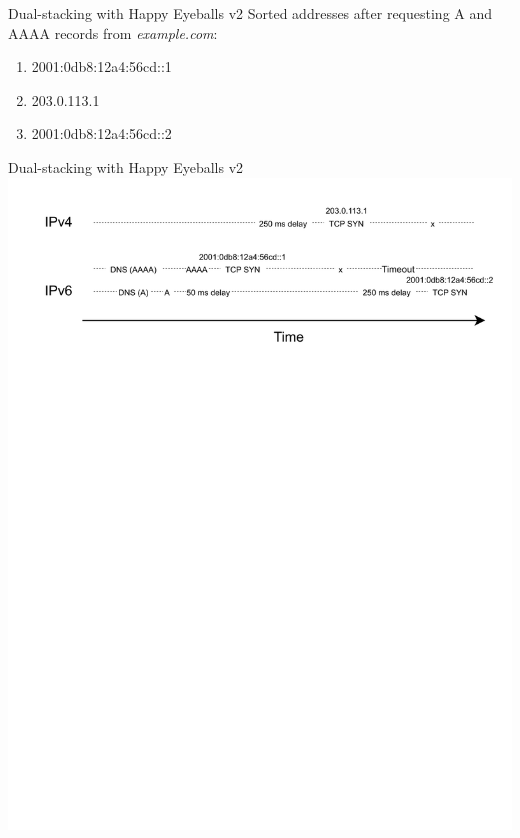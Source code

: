 \documentclass[aspectratio=169]{beamer}
\begin{document}
\begin{frame}{Dual-stacking with Happy Eyeballs v2}
  Sorted addresses after requesting A and AAAA records from \textit{example.com}:
  \begin{enumerate}
    \item 2001:0db8:12a4:56cd::1
    \item 203.0.113.1
    \item 2001:0db8:12a4:56cd::2
  \end{enumerate}
\end{frame}

\begin{frame}{Dual-stacking with Happy Eyeballs v2}
  \centering
  \includegraphics[width=1\textwidth]{hev2v2.pdf}
\end{frame}
\end{document}
